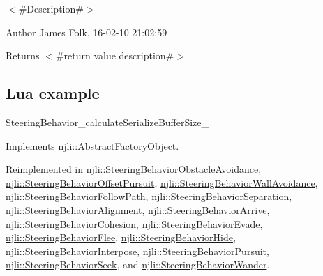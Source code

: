 $<$\#\+Description\#$>$ 

\begin{DoxyAuthor}{Author}
James Folk, 16-\/02-\/10 21\+:02\+:59
\end{DoxyAuthor}
\begin{DoxyReturn}{Returns}
$<$\#return value description\#$>$
\end{DoxyReturn}
\hypertarget{classnjli_1_1_steering_behavior_wander_ex1}{}\subsection{Lua example}\label{classnjli_1_1_steering_behavior_wander_ex1}

\begin{DoxyCodeInclude}
\end{DoxyCodeInclude}
Steering\+Behavior\+\_\+calculate\+Serialize\+Buffer\+Size\+\_\+ 

Implements \mbox{\hyperlink{classnjli_1_1_abstract_factory_object_a838f4fa7e65cace6098aab5222892942}{njli\+::\+Abstract\+Factory\+Object}}.



Reimplemented in \mbox{\hyperlink{classnjli_1_1_steering_behavior_obstacle_avoidance_a84c212466f63945ab7218146f3adc365}{njli\+::\+Steering\+Behavior\+Obstacle\+Avoidance}}, \mbox{\hyperlink{classnjli_1_1_steering_behavior_offset_pursuit_aa0266d0f37251d241f0365b24bf37458}{njli\+::\+Steering\+Behavior\+Offset\+Pursuit}}, \mbox{\hyperlink{classnjli_1_1_steering_behavior_wall_avoidance_aca10b42d39af7c023f2ff45ec6d93891}{njli\+::\+Steering\+Behavior\+Wall\+Avoidance}}, \mbox{\hyperlink{classnjli_1_1_steering_behavior_follow_path_a0bd474599c9cb1b6dc24dfc1e481146b}{njli\+::\+Steering\+Behavior\+Follow\+Path}}, \mbox{\hyperlink{classnjli_1_1_steering_behavior_separation_a2aff6f1cc106f529a580d0812b4545d9}{njli\+::\+Steering\+Behavior\+Separation}}, \mbox{\hyperlink{classnjli_1_1_steering_behavior_alignment_aad8f9ac6f7ca9c4deb87a0a665aa4b5a}{njli\+::\+Steering\+Behavior\+Alignment}}, \mbox{\hyperlink{classnjli_1_1_steering_behavior_arrive_ad6d387b76e083ea4751b097eafa54ae6}{njli\+::\+Steering\+Behavior\+Arrive}}, \mbox{\hyperlink{classnjli_1_1_steering_behavior_cohesion_a4b4358c51b85b8c6ca8ffc61a566b35b}{njli\+::\+Steering\+Behavior\+Cohesion}}, \mbox{\hyperlink{classnjli_1_1_steering_behavior_evade_a65cb01c936a8ca1c879d260a943b16c6}{njli\+::\+Steering\+Behavior\+Evade}}, \mbox{\hyperlink{classnjli_1_1_steering_behavior_flee_a5f6ad77fa0c2aea0c30e248504944695}{njli\+::\+Steering\+Behavior\+Flee}}, \mbox{\hyperlink{classnjli_1_1_steering_behavior_hide_afad231266c18d212e47558624fb768f8}{njli\+::\+Steering\+Behavior\+Hide}}, \mbox{\hyperlink{classnjli_1_1_steering_behavior_interpose_ae6a51b54d67fb4e5abb947f728eed712}{njli\+::\+Steering\+Behavior\+Interpose}}, \mbox{\hyperlink{classnjli_1_1_steering_behavior_pursuit_a353d8fbc26d4ac8af1c907c9ede49324}{njli\+::\+Steering\+Behavior\+Pursuit}}, \mbox{\hyperlink{classnjli_1_1_steering_behavior_seek_a2231d1ba0d0fe3c22116966a403e1408}{njli\+::\+Steering\+Behavior\+Seek}}, and \mbox{\hyperlink{classnjli_1_1_steering_behavior_wander_abcdb8947569af12d7ff3e6bb53a0ed95}{njli\+::\+Steering\+Behavior\+Wander}}.

